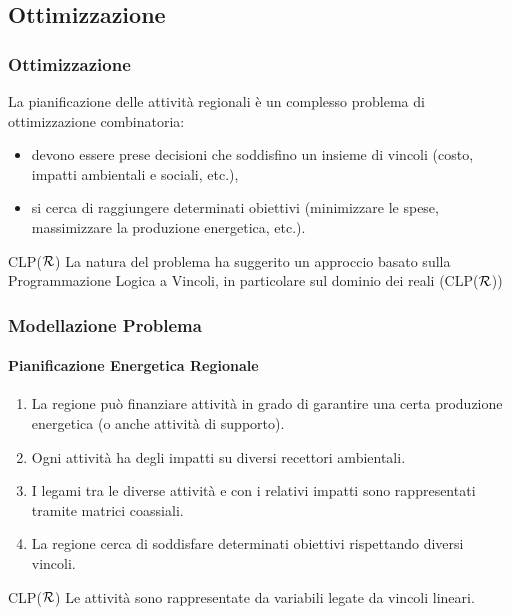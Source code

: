 \documentclass{beamer}
\newcommand{\clpr}{CLP({\ensuremath{\cal R}})}
\begin{document}
\subsection{Ottimizzazione}
	\begin{frame}
		\frametitle{Ottimizzazione}
		\begin{block}{}
			La pianificazione delle attività regionali è un complesso problema di ottimizzazione combinatoria:
			\begin{itemize}
				\item devono essere prese decisioni che soddisfino un insieme di vincoli (costo, impatti ambientali e sociali, etc.), 
				\item si cerca di raggiungere determinati obiettivi (minimizzare le spese, massimizzare la produzione energetica, etc.).
			\end{itemize}
		\end{block}
		\begin{alertblock}{\clpr}
			La natura del problema ha suggerito un approccio basato sulla Programmazione Logica a Vincoli, in particolare sul dominio dei reali (\clpr)
		\end{alertblock}
  	\end{frame}
  	\begin{frame}
		\frametitle{Modellazione Problema}
		\framesubtitle{Pianificazione Energetica Regionale}
		\begin{block}{}
			\begin{enumerate}
				\item La regione può finanziare attività in grado di garantire una certa produzione energetica (o anche attività di supporto).
				\item Ogni attività ha degli impatti su diversi recettori ambientali.
				\item I legami tra le diverse attività e con i relativi impatti sono rappresentati tramite matrici coassiali.
				\item La regione cerca di soddisfare determinati obiettivi rispettando diversi vincoli.
			\end{enumerate}
		\end{block}
		\begin{alertblock}{\clpr}
			Le attività sono rappresentate da variabili legate da vincoli lineari.
		\end{alertblock}
  	\end{frame}
  	
\end{document}
